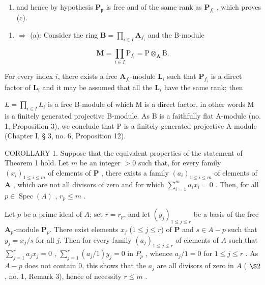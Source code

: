 \begin{enumerate}
\def\labelenumi{\arabic{enumi})}
\setcounter{enumi}{9}
\tightlist
\item
  and hence by hypothesis \(\mathbf{P}_{\mathfrak{p}}\) is free and of the same rank as \(\mathbf{P}_{f_i}\) , which proves (c).
\end{enumerate}

\begin{enumerate}
\def\labelenumi{(\alph{enumi})}
\setcounter{enumi}{3}
\tightlist
\item
  \(\Rightarrow\) (a): Consider the ring \(\mathbf{B} = \prod_{i\in I}\mathbf{A}_{f_i}\) and the B-module
\end{enumerate}

\[
\mathbf {M} = \prod_ {i \in I} \mathrm{P} _ {f _ {i}} = \mathrm{P} \otimes_ {\mathbf {A}} \mathrm{B}.
\]

For every index \(i\), there exists a free \(\mathbf{A}_{f_i}\)-module \(\mathbf{L}_i\) such that \(\mathbf{P}_{f_i}\) is a direct factor of \(\mathbf{L}_i\) and it may be assumed that all the \(\mathbf{L}_i\) have the same rank; then

\(L = \prod_{i \in I} L_i\) is a free B-module of which M is a direct factor, in other words M is a finitely generated projective B-module. As B is a faithfully flat A-module (no. 1, Proposition 3), we conclude that P is a finitely generated projective A-module (Chapter I, § 3, no. 6, Proposition 12).

COROLLARY 1. Suppose that the equivalent properties of the statement of Theorem 1 hold. Let \(m\) be an integer \(>0\) such that, for every family \((x_{i})_{1\leqslant i\leqslant m}\) of elements of \(\mathbf{P}\) , there exists a family \((a_{i})_{1\leqslant i\leqslant m}\) of elements of \(\mathbf{A}\) , which are not all divisors of zero and for which \(\sum_{i=1}^{m} a_i x_i = 0\) . Then, for all \(p \in \operatorname{Spec}(A)\) , \(r_p \leqslant m\) .

Let \(p\) be a prime ideal of \(A\); set \(r = r_p\), and let \((y_j)_{1 \leqslant j \leqslant r}\) be a basis of the free \(\mathbf{A}_{p}\)-module \(\mathbf{P}_{p}\). There exist elements \(x_j\) (\(1 \leqslant j \leqslant r\)) of \(\mathbf{P}\) and \(s \in A - p\) such that \(y_j = x_j / s\) for all \(j\). Then for every family \((a_j)_{1 \leqslant j \leqslant r}\) of elements of \(A\) such that \(\sum_{j=1}^{r} a_j x_j = 0\) , \(\sum_{j=1}^{r} (a_j / 1) y_j = 0\) in \(P_p\) , whence \(a_j / 1 = 0\) for \(1 \leqslant j \leqslant r\) . As \(A - p\) does not contain 0, this shows that the \(a_j\) are all divisors of zero in \(A\) ( \(\S 2\) , no. 1, Remark 3), hence of necessity \(r \leqslant m\) .

